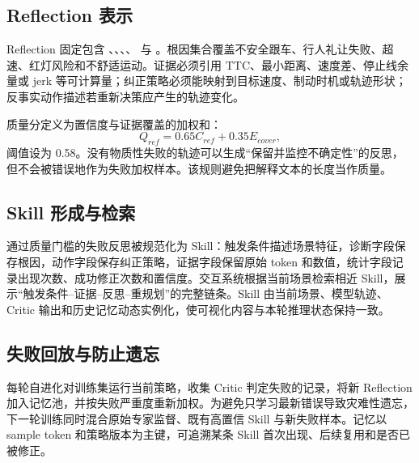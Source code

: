 \documentclass[UTF8,a4paper,12pt,fontset=fandol]{ctexart}
\begin{document}
\subsection{Reflection 表示}
Reflection 固定包含 、、、、 与 。根因集合覆盖不安全跟车、行人礼让失败、超速、红灯风险和不舒适运动。证据必须引用 TTC、最小距离、速度差、停止线余量或 jerk 等可计算量；纠正策略必须能映射到目标速度、制动时机或轨迹形状；反事实动作描述若重新决策应产生的轨迹变化。

质量分定义为置信度与证据覆盖的加权和：
\begin{equation}
Q_{ref}=0.65C_{ref}+0.35E_{cover},
\end{equation}
阈值设为 0.58。没有物质性失败的轨迹可以生成“保留并监控不确定性”的反思，但不会被错误地作为失败加权样本。该规则避免把解释文本的长度当作质量。

\subsection{Skill 形成与检索}
通过质量门槛的失败反思被规范化为 Skill：触发条件描述场景特征，诊断字段保存根因，动作字段保存纠正策略，证据字段保留原始 token 和数值，统计字段记录出现次数、成功修正次数和置信度。交互系统根据当前场景检索相近 Skill，展示“触发条件--证据--反思--重规划”的完整链条。Skill 由当前场景、模型轨迹、Critic 输出和历史记忆动态实例化，使可视化内容与本轮推理状态保持一致。

\subsection{失败回放与防止遗忘}
每轮自进化对训练集运行当前策略，收集 Critic 判定失败的记录，将新 Reflection 加入记忆池，并按失败严重度重新加权。为避免只学习最新错误导致灾难性遗忘，下一轮训练同时混合原始专家监督、既有高置信 Skill 与新失败样本。记忆以 sample token 和策略版本为主键，可追溯某条 Skill 首次出现、后续复用和是否已被修正。
\end{document}
